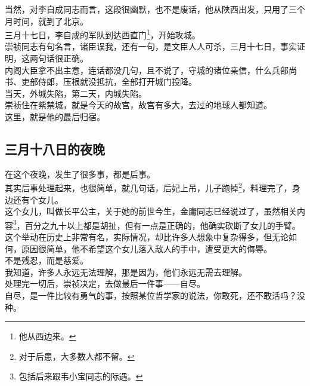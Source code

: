 \begin{multicols}{\theparacolNo}
当然，对李自成同志而言，这段很幽默，也不是废话，他从陕西出发，只用了三个月时间，就到了北京。\\

三月十七日，李自成的军队到达西直门\footnote{他从西边来。}，开始攻城。\\

崇祯同志有句名言，诸臣误我，还有一句，是文臣人人可杀，三月十七日，事实证明，这两句话很正确。\\

内阁大臣拿不出主意，连话都没几句，且不说了，守城的诸位亲信，什么兵部尚书、吏部侍郎，压根就没抵抗，全部打开城门投降。\\

当天，外城失陷，第二天，内城失陷。\\

崇祯住在紫禁城，就是今天的故宫，故宫有多大，去过的地球人都知道。\\

这里，就是他的最后归宿。\\

\subsection{三月十八日的夜晚}
在这个夜晚，发生了很多事，都是后事。\\

其实后事处理起来，也很简单，就几句话，后妃上吊，儿子跑掉\footnote{对于后患，大多数人都不留。}，料理完了，身边还有个女儿。\\

这个女儿，叫做长平公主，关于她的前世今生，金庸同志已经说过了，虽然相关内容\footnote{包括后来跟韦小宝同志的际遇。}，百分之九十以上都是胡扯，但有一点是正确的，他确实砍断了女儿的手臂。\\

这个举动在历史上非常有名，实际情况，却比许多人想象中复杂得多，但无论如何，原因很简单，他不希望这个女儿落入敌人的手中，遭受更大的侮辱。\\

不是残忍，而是慈爱。\\

我知道，许多人永远无法理解，那是因为，他们永远无需去理解。\\

处理完一切后，崇祯决定，去做最后一件事——自尽。\\

自尽，是一件比较有勇气的事，按照某位哲学家的说法，你敢死，还不敢活吗？没种。\\


\end{multicols}
